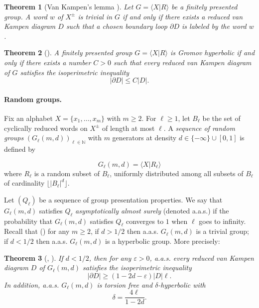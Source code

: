 \documentclass[a4paper]{article}
\newcommand\flr[1]{\lfloor #1 \rfloor}
\newcommand\Pres[2]{\langle #1 | #2 \rangle}
\newtheorem{thm}{Theorem}[section]
\theoremstyle{remark}
\begin{document}
\begin{thm}[Van Kampen's lemma \cite{vK33}]
    Let $G = \Pres{X}{R}$ be a finitely presented group. A word $w$ of $X^\pm$ is trivial in $G$ if and only if there exists a reduced van Kampen diagram $D$ such that a chosen boundary loop $\partial D$ is labeled by the word $w$.
\end{thm}


\begin{thm}[\cite{Gro87}]
    A finitely presented group $G = \Pres{X}{R}$ is Gromov hyperbolic if and only if there exists a number $C>0$ such that every reduced van Kampen diagram of $G$ satisfies the isoperimetric inequality
    \[|\partial D| \leq C|D|.\]
\end{thm}


\paragraph{Random groups.} Fix an alphabet $X = \{x_1,\dots,x_m\}$ with $m\geq 2$. For $\ell\geq1$, let $B_\ell$ be the set of cyclically reduced words on $X^\pm$ of length at most $\ell$. A \textit{sequence of random groups} $(G_\ell(m,d))_{\ell\in\mathbb{N}}$ with $m$ generators at density $d\in \{-\infty\}\cup[0,1]$ is defined by 

\[G_\ell(m,d) = \Pres{X}{R_\ell}\] 
where $R_\ell$ is a random subset of $B_\ell$, uniformly distributed among all subsets of $B_\ell$ of cardinality $\flr{|B_\ell|^d}$.

Let $(Q_\ell)$ be a sequence of group presentation properties. We say that $G_\ell(m,d)$ satisfies $Q_\ell$ \textit{asymptotically almost surely} (denoted a.a.s.) if the probability that $G_\ell(m,d)$ satisfies $Q_\ell$ converges to $1$ when $\ell$ goes to infinity.\\

Recall that (\cite{Gro93}) for any $m\geq 2$, if $d>1/2$ then a.a.s. $G_\ell(m,d)$ is a trivial group; if $d<1/2$ then a.a.s. $G_\ell(m,d)$ is a hyperbolic group. More precisely:

\begin{thm}[{\cite{Gro93}}, {\cite{Oll07}}]\label{inequality for diagrams} If $d<1/2$, then for any $\varepsilon>0$, a.a.s. every reduced van Kampen diagram $D$ of $G_\ell(m,d)$ satisfies the isoperimetric inequality
\[|\partial D|\geq (1-2d-\varepsilon)|D|\ell.\]
In addition, a.a.s. $G_\ell(m,d)$ is torsion free and $\delta$-hyperbolic with 
    \[\delta = \frac{4\ell}{1-2d}.\]
\end{thm}
\end{document}

